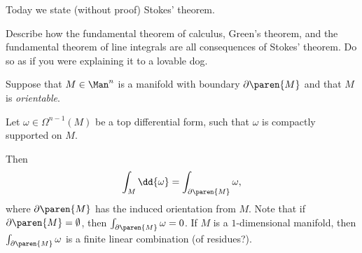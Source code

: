 Today we state (without proof) Stokes' theorem. 

\begin{ex}[Essay]
    \label{ex:essay}
    Describe how the fundamental theorem of calculus, Green's theorem, and the fundamental theorem of line integrals are all consequences of Stokes' theorem. Do so as if you were explaining it to a lovable dog.
\end{ex}

Suppose that $M \in \Man^n$ is a manifold with boundary $\partial\paren{M}$ and that $M$ is \emph{orientable}.

Let $\omega \in \Omega^{n-1}(M)$ be a top differential form, such that $\omega$ is compactly supported on $M$.

Then
\begin{equation*}
    \int_M \dd{\omega} = \int_{\partial\paren{M}}\omega,
\end{equation*}
where $\partial\paren{M}$ has the induced orientation from $M$. Note that if $\partial\paren{M} = \emptyset$, then $\int_{\partial\paren{M}}\omega = 0$. If $M$ is a $1$-dimensional manifold, then $\int_{\partial\paren{M}}\omega$ is a finite linear combination (of \TODO residues?).

